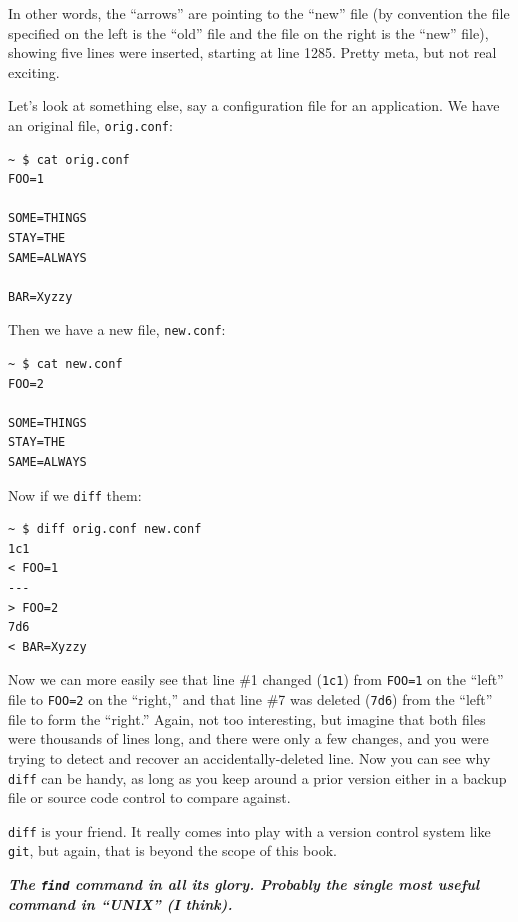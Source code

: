 \documentclass[10pt,]{book}
\numberwithin{figure}{chapter}
\begin{document}
In other words, the ``arrows'' are pointing to the ``new'' file (by
convention the file specified on the left is the ``old'' file and the
file on the right is the ``new'' file), showing five lines were
inserted, starting at line 1285. Pretty meta, but not real exciting.

Let's look at something else, say a configuration file for an
application. We have an original file, \texttt{orig.conf}:

\begin{verbatim}
~ $ cat orig.conf
FOO=1

SOME=THINGS
STAY=THE
SAME=ALWAYS

BAR=Xyzzy
\end{verbatim}

Then we have a new file, \texttt{new.conf}:

\begin{verbatim}
~ $ cat new.conf
FOO=2

SOME=THINGS
STAY=THE
SAME=ALWAYS
\end{verbatim}

Now if we \texttt{diff} them:

\begin{verbatim}
~ $ diff orig.conf new.conf
1c1
< FOO=1
---
> FOO=2
7d6
< BAR=Xyzzy
\end{verbatim}

Now we can more easily see that line \#1 changed (\texttt{1c1}) from
\texttt{FOO=1} on the ``left'' file to \texttt{FOO=2} on the ``right,''
and that line \#7 was deleted (\texttt{7d6}) from the ``left'' file to
form the ``right.'' Again, not too interesting, but imagine that both
files were thousands of lines long, and there were only a few changes,
and you were trying to detect and recover an accidentally-deleted line.
Now you can see why \texttt{diff} can be handy, as long as you keep
around a prior version either in a backup file or source code control to
compare against.

\texttt{diff} is your friend. It really comes into play with a version
control system like \texttt{git}, but again, that is beyond the scope of
this book.


\textbf{\emph{The \texttt{find} command in all its glory. Probably the
single most useful command in ``UNIX'' (I think).}}
\end{document}
